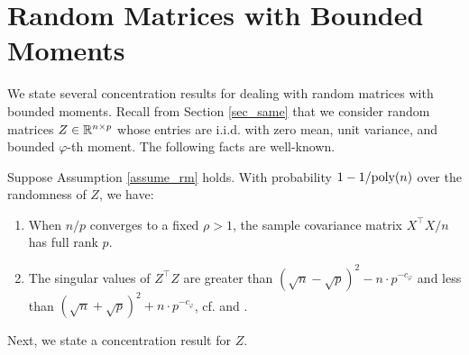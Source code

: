 \section{Random Matrices with Bounded Moments}\label{app_tool}

We state several concentration results for dealing with random matrices with bounded moments.
Recall from Section \ref{sec_same} that we consider random matrices $Z \in \mathbb{R}^{n\times p}$ whose entries are i.i.d. with zero mean, unit variance, and bounded $\varphi$-th moment.
The following facts are well-known.

\begin{fact}\label{fact_minv}
	Suppose Assumption \ref{assume_rm} holds. With probability $1- 1 / \textup{poly}(n)$ over the randomness of $Z$, we have:
	\begin{enumerate}
		\item When $n / p$ converges to a fixed $\rho > 1$, the sample covariance matrix ${X^{\top}X} / n$ has full rank $p$.
		\item The singular values of $Z^{\top}Z$ are greater than $(\sqrt{n} - \sqrt{p})^2 - n \cdot p^{-c_{\varphi}}$ and less than $(\sqrt{n} + \sqrt{p})^2 + n \cdot p^{-c_{\varphi}}$, cf. \citet[Theorem 2.10]{isotropic} and \citet[Lemma 3.12]{DY}.
	\end{enumerate}
\end{fact}

Next, we state a concentration result for $Z$.

